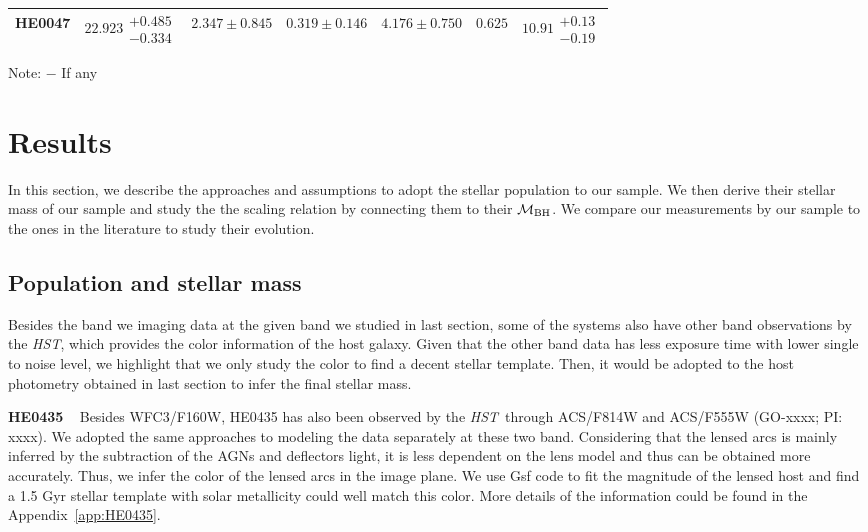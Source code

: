 \documentclass[fleqn,usenatbib]{mnras}
\newcommand{\hst}{{\it HST}}
\newcommand{\mbh}{$\mathcal M_{\rm BH}$}
\begin{document}
\begin{table}
\begin{threeparttable}
\begin{tabular}{ccccccc}
HE0047 & $22.923\substack{+0.485\\-0.334}$ & $2.347\pm0.845$ & $0.319\pm0.146$ & $4.176\pm0.750$ & $0.625$ & $10.91\substack{+0.13\\-0.19}$ \\
\hline
\end{tabular}
\begin{tablenotes}
      \small
      \item Note: $-$ If any
\end{tablenotes}    
\end{threeparttable}
\end{table}


\section{Results}\label{sec:result}
In this section, we describe the approaches and assumptions to adopt the stellar population to our sample. We then derive their stellar mass of our sample and study the  the scaling relation by connecting them to their \mbh. We compare our measurements by our sample to the ones in the literature to study their evolution.

\subsection{Population and stellar mass}\label{sec:mstar}
Besides the band we imaging data at the given band we studied in last section, some of the systems also have other band observations by the \hst, which provides the color information of the host galaxy. Given that the other band data has less exposure time with lower single to noise level, we highlight that we only study the color to find a decent stellar template. Then, it would be adopted to the host photometry obtained in last section to infer the final stellar mass.

{\bf HE0435} ~ Besides WFC3/F160W, HE0435 has also been observed by the \hst\ through ACS/F814W and ACS/F555W (GO-xxxx; PI: xxxx). We adopted the same approaches to modeling the data separately at these two band. %
Considering that the lensed arcs is mainly inferred by the subtraction of the AGNs and deflectors light, it is less dependent on the lens model and thus can be obtained more accurately. Thus, we infer the color of the lensed arcs in the image plane. We use {\sc Gsf} code to fit the magnitude of the lensed host and find a 1.5 Gyr stellar template with solar metallicity could well match this color. More details of the information could be found in the Appendix~\ref{app:HE0435}.
\end{document}
